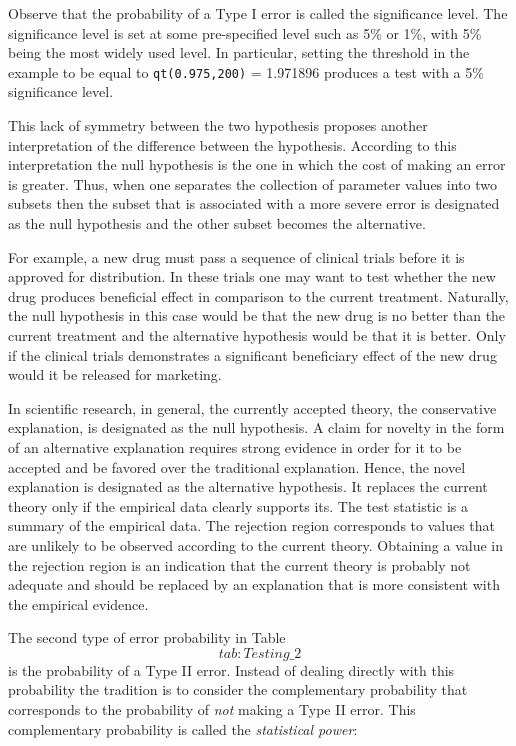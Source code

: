 \documentclass[
]{krantz}
\theoremstyle{definition}
\theoremstyle{definition}
\theoremstyle{definition}
\theoremstyle{remark}
\begin{document}
Observe that the probability of a Type I error is called the
significance level. The significance level is set at some pre-specified
level such as 5\% or 1\%, with 5\% being the most widely used level. In
particular, setting the threshold in the example to be equal to
\texttt{qt(0.975,200)} = 1.971896 produces a test with a 5\% significance level.

This lack of symmetry between the two hypothesis proposes another
interpretation of the difference between the hypothesis. According to
this interpretation the null hypothesis is the one in which the cost of
making an error is greater. Thus, when one separates the collection of
parameter values into two subsets then the subset that is associated
with a more severe error is designated as the null hypothesis and the
other subset becomes the alternative.

For example, a new drug must pass a sequence of clinical trials before
it is approved for distribution. In these trials one may want to test
whether the new drug produces beneficial effect in comparison to the
current treatment. Naturally, the null hypothesis in this case would be
that the new drug is no better than the current treatment and the
alternative hypothesis would be that it is better. Only if the clinical
trials demonstrates a significant beneficiary effect of the new drug
would it be released for marketing.

In scientific research, in general, the currently accepted theory, the
conservative explanation, is designated as the null hypothesis. A claim
for novelty in the form of an alternative explanation requires strong
evidence in order for it to be accepted and be favored over the
traditional explanation. Hence, the novel explanation is designated as
the alternative hypothesis. It replaces the current theory only if the
empirical data clearly supports its. The test statistic is a summary of
the empirical data. The rejection region corresponds to values that are
unlikely to be observed according to the current theory. Obtaining a
value in the rejection region is an indication that the current theory
is probably not adequate and should be replaced by an explanation that
is more consistent with the empirical evidence.

The second type of error probability in Table~\[tab:Testing\_2\] is the
probability of a Type II error. Instead of dealing directly with this
probability the tradition is to consider the complementary probability
that corresponds to the probability of \emph{not} making a Type II error.
This complementary probability is called the \emph{statistical power}:
\end{document}
